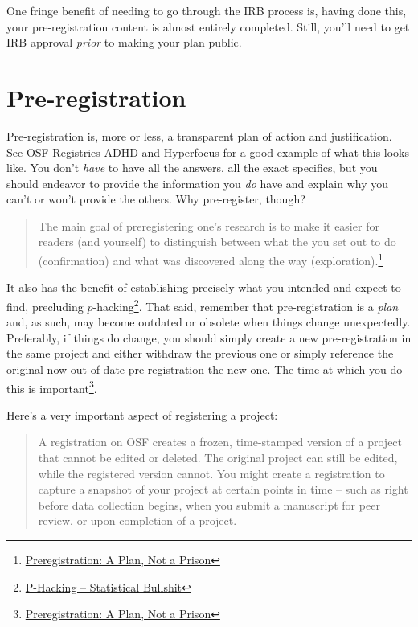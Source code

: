 \documentclass[]{tufte-book}
\begin{document}
One fringe benefit of needing to go through the IRB process is, having done this, your pre-registration content is almost entirely completed. Still, you'll need to get IRB approval \emph{prior} to making your plan public.

\hypertarget{pre-registration}{%
\section{Pre-registration}\label{pre-registration}}

Pre-registration is, more or less, a transparent plan of action and justification. See \href{https://osf.io/ta92r}{OSF Registries \textbar{} ADHD and Hyperfocus} for a good example of what this looks like. You don't \emph{have} to have all the answers, all the exact specifics, but you should endeavor to provide the information you \emph{do} have and explain why you can't or won't provide the others. Why pre-register, though?

\begin{quote}
The main goal of preregistering one's research is to make it easier for readers (and yourself) to distinguish between what the you set out to do (confirmation) and what was discovered along the way (exploration).\footnote{\href{https://www.cos.io/blog/preregistration-plan-not-prison}{Preregistration: A Plan, Not a Prison}}
\end{quote}

It also has the benefit of establishing precisely what you intended and expect to find, precluding \(p\)-hacking\footnote{\href{https://statisticalbullshit.com/2017/07/17/p-hacking/}{P-Hacking -- Statistical Bullshit}}. That said, remember that pre-registration is a \emph{plan} and, as such, may become outdated or obsolete when things change unexpectedly. Preferably, if things do change, you should simply create a new pre-registration in the same project and either withdraw the previous one or simply reference the original now out-of-date pre-registration the new one. The time at which you do this is important\footnote{\href{https://www.cos.io/blog/preregistration-plan-not-prison}{Preregistration: A Plan, Not a Prison}}.

Here's a very important aspect of registering a project:

\begin{quote}
A registration on OSF creates a frozen, time-stamped version of a project that cannot be edited or deleted. The original project can still be edited, while the registered version cannot. You might create a registration to capture a snapshot of your project at certain points in time -- such as right before data collection begins, when you submit a manuscript for peer review, or upon completion of a project.
\end{quote}
\end{document}
